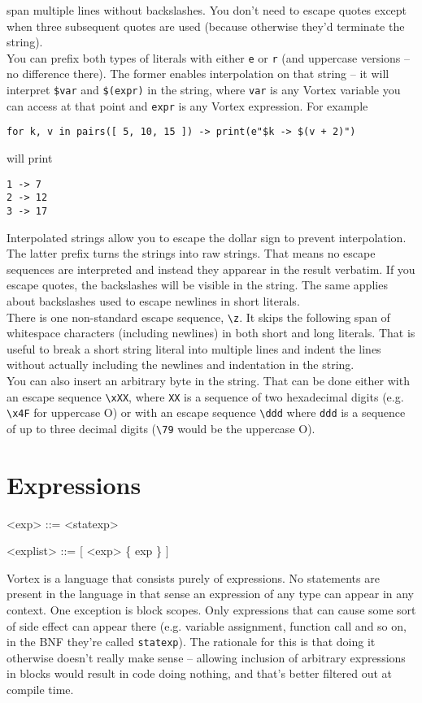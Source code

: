 \documentclass{article}
\newenvironment{bnf}
{
\begin{mdframed}
\begin{grammar}
}
{
\end{grammar}
\end{mdframed}
}
\begin{document}
span multiple lines without backslashes. You don't need to escape quotes except
when three subsequent quotes are used (because otherwise they'd terminate the
string).\\
You can prefix both types of literals with either \verb|e| or \verb|r| (and
uppercase versions -- no difference there). The former enables interpolation
on that string -- it will interpret \verb|$var| and \verb|$(expr)| in the
string, where \verb|var| is any Vortex variable you can access at that point
and \verb|expr| is any Vortex expression. For example
\begin{lstlisting}[language=vortex]
for k, v in pairs([ 5, 10, 15 ]) -> print(e"$k -> $(v + 2)")
\end{lstlisting}
will print
\begin{lstlisting}[language=text]
1 -> 7
2 -> 12
3 -> 17
\end{lstlisting}
Interpolated strings allow you to escape the dollar sign to prevent
interpolation.
\\
The latter prefix turns the strings into raw strings. That means no escape
sequences are interpreted and instead they apparear in the result verbatim.
If you escape quotes, the backslashes will be visible in the string. The same
applies about backslashes used to escape newlines in short literals.\\
There is one non-standard escape sequence, \verb|\z|. It skips the following
span of whitespace characters (including newlines) in both short and long
literals. That is useful to break a short string literal into multiple lines
and indent the lines without actually including the newlines and indentation
in the string.\\
You can also insert an arbitrary byte in the string. That can be done either
with an escape sequence \verb|\xXX|, where \verb|XX| is a sequence of two
hexadecimal digits (e.g. \verb|\x4F| for uppercase O) or with an escape
sequence \verb|\ddd| where \verb|ddd| is a sequence of up to three decimal
digits (\verb|\79| would be the uppercase O).

\section{Expressions}
\begin{bnf}
<exp> ::= <statexp>

<explist> ::= [ <exp> \{ \lit{,} exp \} ]
\end{bnf}
Vortex is a language that consists purely of expressions. No statements are
present in the language in that sense an expression of any type can appear
in any context. One exception is block scopes. Only expressions that can
cause some sort of side effect can appear there (e.g. variable assignment,
function call and so on, in the BNF they're called \verb|statexp|).
The rationale for this is that doing it otherwise doesn't really make sense
-- allowing inclusion of arbitrary expressions in blocks would result in code
doing nothing, and that's better filtered out at compile time.
\end{document}
